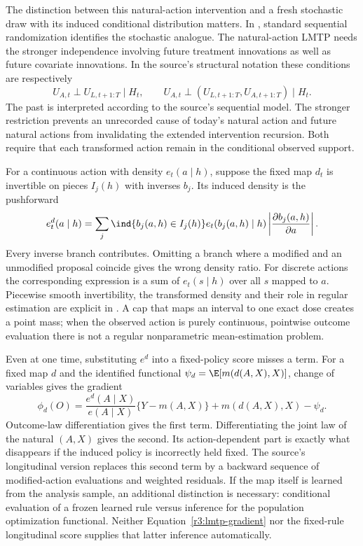 The distinction between this natural-action intervention and a fresh
stochastic draw with its induced conditional distribution matters.
In \citet[Assumptions 1--3 and Theorem 1]{lmtp2023}, standard
sequential randomization identifies the stochastic analogue. The
natural-action LMTP needs the stronger independence involving future
treatment innovations as well as future covariate innovations. In
the source's structural notation these conditions are respectively
\[
 U_{A,t}\perp U_{L,t+1:T}\mid H_t,\qquad
 U_{A,t}\perp (U_{L,t+1:T},U_{A,t+1:T})\mid H_t.
\]
The past is interpreted according to the source's sequential model.
The stronger restriction prevents an unrecorded cause of today's
natural action and future natural actions from invalidating the
extended intervention recursion. Both require that each transformed
action remain in the conditional observed support.

For a continuous action with density $e_t(a\mid h)$, suppose the
fixed map $d_t$ is invertible on pieces $I_j(h)$ with inverses $b_j$.
Its induced density is the pushforward
\begin{equation}
 e_t^d(a\mid h)=\sum_j
 \ind\{b_j(a,h)\in I_j(h)\}
 e_t(b_j(a,h)\mid h)\left|\frac{\partial b_j(a,h)}{\partial a}\right|.
 \label{r3:pushforward}
\end{equation}
Every inverse branch contributes. Omitting a branch where a modified
and an unmodified proposal coincide gives the wrong density ratio.
For discrete actions the corresponding expression is a sum of
$e_t(s\mid h)$ over all $s$ mapped to $a$. Piecewise smooth
invertibility, the transformed density and their role in regular
estimation are explicit in \citet[Assumption 4 and Theorem 2]{lmtp2023}.
A cap that maps an interval to one exact dose creates a point mass;
when the observed action is purely continuous, pointwise outcome
evaluation there is not a regular nonparametric mean-estimation problem.

Even at one time, substituting $e^d$ into a fixed-policy score misses a
term. For a fixed map $d$ and the identified functional
$\psi_d=\E[m(d(A,X),X)]$, change of variables gives the gradient
\begin{equation}
 \phi_d(O)=\frac{e^d(A\mid X)}{e(A\mid X)}\{Y-m(A,X)\}
                 +m(d(A,X),X)-\psi_d.
 \label{r3:lmtp-gradient}
\end{equation}
Outcome-law differentiation gives the first term. Differentiating the
joint law of the natural $(A,X)$ gives the second. Its action-dependent
part is exactly what disappears if the induced policy is incorrectly
held fixed. The source's longitudinal version replaces this second
term by a backward sequence of modified-action evaluations and
weighted residuals. If the map itself is learned from the analysis
sample, an additional distinction is necessary: conditional evaluation
of a frozen learned rule versus inference for the population optimization
functional. Neither Equation~\eqref{r3:lmtp-gradient} nor the
fixed-rule longitudinal score supplies that latter inference automatically.

